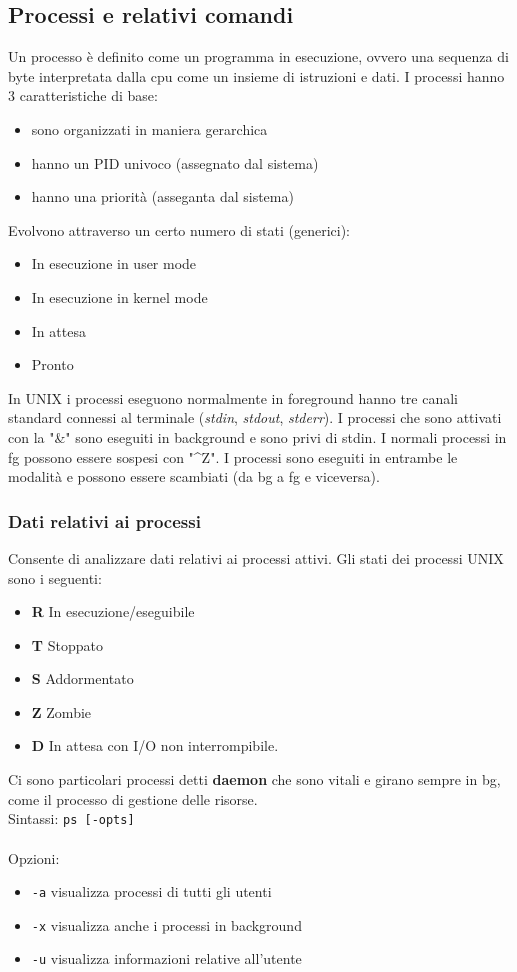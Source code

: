\documentclass[a4paper]{article}
\begin{document}
\subsection{Processi e relativi comandi}
Un processo è definito come un programma in esecuzione, ovvero una sequenza di byte interpretata dalla cpu come un insieme di istruzioni e dati. I processi hanno 3 caratteristiche di base:
\begin{itemize}
\item sono organizzati in maniera gerarchica
\item hanno un PID univoco (assegnato dal sistema)
\item hanno una priorità (asseganta dal sistema)
\end{itemize}
Evolvono attraverso un certo numero di stati (generici):
\begin{itemize}
\item In esecuzione in user mode
\item In esecuzione in kernel mode
\item In attesa
\item Pronto
\end{itemize}
In UNIX i processi eseguono normalmente in foreground hanno tre canali standard connessi al terminale (\textit{stdin}, \textit{stdout}, \textit{stderr}). I processi che sono attivati con la "\&" sono eseguiti in background e sono privi di stdin. I normali processi in fg possono essere sospesi con "\^{}Z". I processi sono eseguiti in entrambe le modalità e possono essere scambiati (da bg a fg e viceversa).

\subsubsection{Dati relativi ai processi} Consente di analizzare dati relativi ai processi attivi. Gli stati dei processi UNIX sono  i seguenti:
\begin{itemize}
\item \textbf{R} In esecuzione/eseguibile
\item \textbf{T} Stoppato
\item \textbf{S} Addormentato
\item \textbf{Z} Zombie
\item \textbf{D} In attesa con I/O non interrompibile.
\end{itemize}
Ci sono particolari processi detti \textbf{daemon} che sono vitali e girano sempre in bg, come il processo di gestione delle risorse. \\
Sintassi:
\verb|ps [-opts]| \\ \\
Opzioni:
\begin{itemize}
\item \verb|-a| visualizza processi di tutti gli utenti
\item \verb|-x| visualizza anche i processi in background
\item \verb|-u| visualizza informazioni relative all'utente
\end{itemize}
\end{document}
